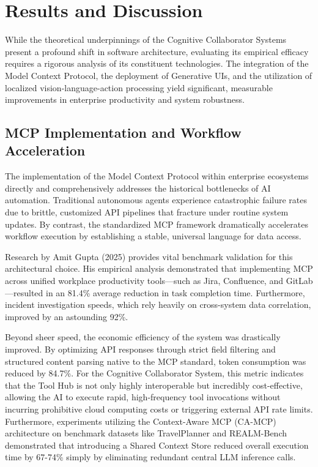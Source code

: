 \documentclass[12pt, a4paper]{report}
\begin{document}
\chapter{Results and Discussion}
While the theoretical underpinnings of the Cognitive Collaborator Systems present a profound shift in software architecture, evaluating its empirical efficacy requires a rigorous analysis of its constituent technologies. The integration of the Model Context Protocol, the deployment of Generative UIs, and the utilization of localized vision-language-action processing yield significant, measurable improvements in enterprise productivity and system robustness.

\section{MCP Implementation and Workflow Acceleration}
The implementation of the Model Context Protocol within enterprise ecosystems directly and comprehensively addresses the historical bottlenecks of AI automation. Traditional autonomous agents experience catastrophic failure rates due to brittle, customized API pipelines that fracture under routine system updates. By contrast, the standardized MCP framework dramatically accelerates workflow execution by establishing a stable, universal language for data access.\cite{hallam2026}

Research by Amit Gupta (2025) provides vital benchmark validation for this architectural choice. His empirical analysis demonstrated that implementing MCP across unified workplace productivity tools—such as Jira, Confluence, and GitLab—resulted in an 81.4\% average reduction in task completion time.\cite{hojo2025} Furthermore, incident investigation speeds, which rely heavily on cross-system data correlation, improved by an astounding 92\%.\cite{hojo2025}

Beyond sheer speed, the economic efficiency of the system was drastically improved. By optimizing API responses through strict field filtering and structured content parsing native to the MCP standard, token consumption was reduced by 84.7\%.\cite{hojo2025} For the Cognitive Collaborator System, this metric indicates that the Tool Hub is not only highly interoperable but incredibly cost-effective, allowing the AI to execute rapid, high-frequency tool invocations without incurring prohibitive cloud computing costs or triggering external API rate limits. Furthermore, experiments utilizing the Context-Aware MCP (CA-MCP) architecture on benchmark datasets like TravelPlanner and REALM-Bench demonstrated that introducing a Shared Context Store reduced overall execution time by 67-74\% simply by eliminating redundant central LLM inference calls.\cite{arxiv2601}
\end{document}
